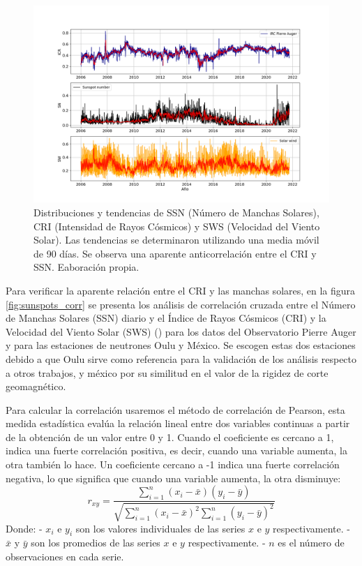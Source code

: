 \begin{figure}
    \includegraphics[width=1.1\linewidth]{Figs/Figr/CRI_SN_SW_over.png}
    \caption{Distribuciones y tendencias de SSN (Número de Manchas Solares), CRI (Intensidad de Rayos Cósmicos) y SWS (Velocidad del Viento Solar). Las tendencias se determinaron utilizando una media móvil de 90 días. Se observa una aparente anticorrelación entre el CRI y SSN. Eaboración propia.}
    \label{fig:CRIvsSN}
\end{figure}
Para verificar la aparente relación entre el CRI y las manchas solares, en la figura \ref{fig:sunspots_corr} se presenta los análisis de correlación cruzada entre el Número de Manchas Solares (SSN) diario y el Índice de Rayos Cósmicos (CRI) y la Velocidad del Viento Solar (SWS) (\cite{Oloketuyi_2020}) para los datos del Observatorio Pierre Auger y para las estaciones de neutrones Oulu y México. Se escogen estas dos estaciones debido a que Oulu sirve como referencia para la validación de los análisis respecto a otros trabajos, y méxico por su similitud en el valor de la rigidez de corte geomagnético.

Para calcular la correlación usaremos el método de correlación de Pearson, esta medida estadística evalúa la relación lineal entre dos variables continuas a partir de la obtención de un valor entre 0 y 1. Cuando el coeficiente es cercano a 1, indica una fuerte correlación positiva, es decir, cuando una variable aumenta, la otra también lo hace. Un coeficiente cercano a -1 indica una fuerte correlación negativa, lo que significa que cuando una variable aumenta, la otra disminuye:
$$ r_{xy} = \frac{\sum_{i=1}^{n} (x_i - \bar{x})(y_i - \bar{y})}{\sqrt{\sum_{i=1}^{n} (x_i - \bar{x})^2 \sum_{i=1}^{n} (y_i - \bar{y})^2}} $$
Donde:
- $x_i$ e $y_i$ son los valores individuales de las series $x$ e $y$ respectivamente.
- $\bar{x}$ y $\bar{y}$ son los promedios de las series $x$ e $y$ respectivamente.
- $n$ es el número de observaciones en cada serie.

